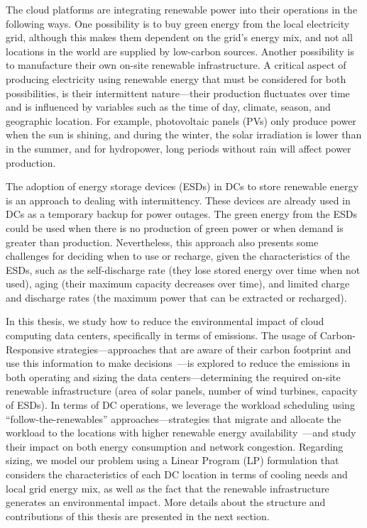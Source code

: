 The cloud platforms are integrating renewable power into their operations in the following ways. One possibility is to buy green energy from the local electricity grid, although this makes them dependent on the grid's energy mix, and not all locations in the world are supplied by low-carbon sources. Another possibility is to manufacture their own on-site renewable infrastructure. A critical aspect of producing electricity using renewable energy that must be considered for both possibilities,  is their intermittent nature---their production fluctuates over time and is influenced by variables such as the time of day, climate, season, and geographic location. For example, photovoltaic panels (PVs) only produce power when the sun is shining, and during the winter, the solar irradiation is lower than in the summer, and for hydropower, long periods without rain will affect power production.

The adoption of energy storage devices (ESDs) in DCs to store renewable energy~\cite{wang2012_EDCS} is an approach to dealing with intermittency. These devices are already used in DCs as a temporary backup for power outages. The green energy from the ESDs could be used when there is no production of green power or when demand is greater than production. Nevertheless, this approach also presents some challenges for deciding when to use or recharge, given the characteristics of the ESDs, such as the self-discharge rate (they lose stored energy over time when not used), aging (their maximum capacity decreases over time), and limited charge and discharge rates (the maximum power that can be extracted or recharged).

In this thesis, we study how to reduce the environmental impact of cloud computing data centers, specifically in terms of  emissions. The usage of Carbon-Responsive strategies---approaches that are aware of their carbon footprint and use this information to make decisions~\cite{schooler2021carbonaware}---is explored to reduce the  emissions in both operating and sizing the data centers---determining the required on-site renewable infrastructure (area of solar panels, number of wind turbines, capacity of ESDs). In terms of DC operations, we leverage the workload scheduling using ``follow-the-renewables'' approaches---strategies that migrate and allocate the workload to the locations with higher renewable energy availability~\cite{shuja2016sustainable}---and study their impact on both energy consumption and network congestion. Regarding sizing, we model our problem using a Linear Program (LP) formulation that considers the characteristics of each DC location in terms of cooling needs and local grid energy mix, as well as the fact that the renewable infrastructure generates an environmental impact. More details about the structure and contributions of this thesis are presented in the next section.

